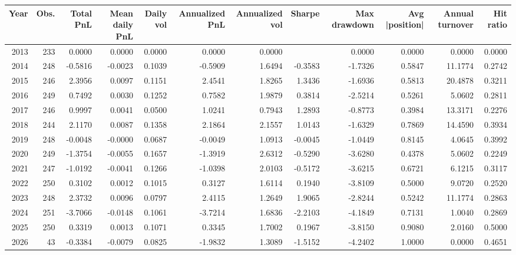 \begin{tabular}{rrrrrrrrrrrr}
\toprule
Year & Obs. & Total PnL & Mean daily PnL & Daily vol & Annualized PnL & Annualized vol & Sharpe & Max drawdown & Avg |position| & Annual turnover & Hit ratio \\
\midrule
2013 & 233 & 0.0000 & 0.0000 & 0.0000 & 0.0000 & 0.0000 &  & 0.0000 & 0.0000 & 0.0000 & 0.0000 \\
2014 & 248 & -0.5816 & -0.0023 & 0.1039 & -0.5909 & 1.6494 & -0.3583 & -1.7326 & 0.5847 & 11.1774 & 0.2742 \\
2015 & 246 & 2.3956 & 0.0097 & 0.1151 & 2.4541 & 1.8265 & 1.3436 & -1.6936 & 0.5813 & 20.4878 & 0.3211 \\
2016 & 249 & 0.7492 & 0.0030 & 0.1252 & 0.7582 & 1.9879 & 0.3814 & -2.5214 & 0.5261 & 5.0602 & 0.2811 \\
2017 & 246 & 0.9997 & 0.0041 & 0.0500 & 1.0241 & 0.7943 & 1.2893 & -0.8773 & 0.3984 & 13.3171 & 0.2276 \\
2018 & 244 & 2.1170 & 0.0087 & 0.1358 & 2.1864 & 2.1557 & 1.0143 & -1.6329 & 0.7869 & 14.4590 & 0.3934 \\
2019 & 248 & -0.0048 & -0.0000 & 0.0687 & -0.0049 & 1.0913 & -0.0045 & -1.0449 & 0.8145 & 4.0645 & 0.3992 \\
2020 & 249 & -1.3754 & -0.0055 & 0.1657 & -1.3919 & 2.6312 & -0.5290 & -3.6280 & 0.4378 & 5.0602 & 0.2249 \\
2021 & 247 & -1.0192 & -0.0041 & 0.1266 & -1.0398 & 2.0103 & -0.5172 & -3.6215 & 0.6721 & 6.1215 & 0.3117 \\
2022 & 250 & 0.3102 & 0.0012 & 0.1015 & 0.3127 & 1.6114 & 0.1940 & -3.8109 & 0.5000 & 9.0720 & 0.2520 \\
2023 & 248 & 2.3732 & 0.0096 & 0.0797 & 2.4115 & 1.2649 & 1.9065 & -2.8244 & 0.5242 & 11.1774 & 0.2863 \\
2024 & 251 & -3.7066 & -0.0148 & 0.1061 & -3.7214 & 1.6836 & -2.2103 & -4.1849 & 0.7131 & 1.0040 & 0.2869 \\
2025 & 250 & 0.3319 & 0.0013 & 0.1071 & 0.3345 & 1.7002 & 0.1967 & -3.8150 & 0.9080 & 2.0160 & 0.5000 \\
2026 & 43 & -0.3384 & -0.0079 & 0.0825 & -1.9832 & 1.3089 & -1.5152 & -4.2402 & 1.0000 & 0.0000 & 0.4651 \\
\bottomrule
\end{tabular}
